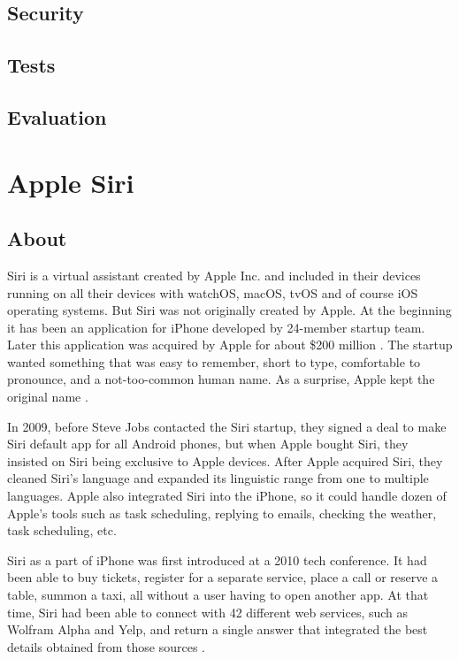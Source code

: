 \documentclass[
  digital, %
  oneside, %
  table,   %
  lof,     %
  lot,     %
]{fithesis3}
\begin{document}
\section{Security}
\section{Tests}
\section{Evaluation}

\chapter{Apple Siri}\label{ch:siri}
\section{About}
Siri is a virtual assistant created by Apple Inc. and included in their devices running on all their devices with watchOS, macOS, tvOS and of course iOS operating systems. But Siri was not originally created by Apple. At the beginning it has been an application for iPhone developed by 24-member startup team. Later this application was acquired by Apple for about \$200 million \parencite{siri_buy}. The startup wanted something that was easy to remember, short to type, comfortable to pronounce, and a not-too-common human name. As a surprise, Apple kept the original name \parencite{siri_name}.

In 2009, before Steve Jobs contacted the Siri startup, they signed a deal to make Siri default app for all Android phones, but when Apple bought Siri, they insisted on Siri being exclusive to Apple devices. After Apple acquired Siri, they cleaned Siri's language and expanded its linguistic range from one to multiple languages. Apple also integrated Siri into the iPhone, so it could handle dozen of Apple's tools such as task scheduling, replying to emails, checking the weather, task scheduling, etc.

Siri as a part of iPhone was first introduced at a 2010 tech conference. It had been able to  buy tickets, register for a separate service, place a call or reserve a table, summon a taxi, all without a user having to open another app. At that time, Siri had been able to connect with 42 different web services, such as Wolfram Alpha and Yelp, and return a single answer that integrated the best details obtained from those sources \parencite{siri_rising}.
\end{document}
